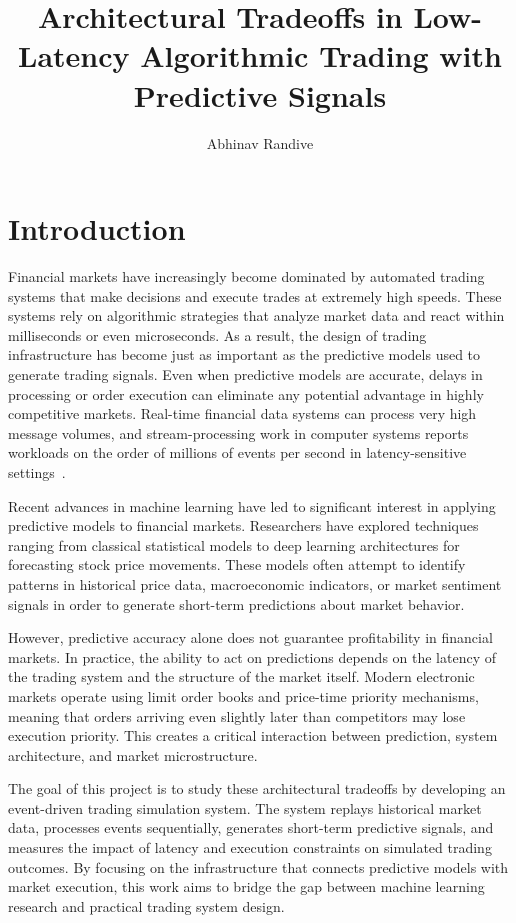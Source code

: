 \documentclass[12pt]{article}
\title{\textbf{Architectural Tradeoffs in Low-Latency
Algorithmic Trading with Predictive Signals}}
\author{Abhinav Randive}
\begin{document}
\maketitle

\section{Introduction}
Financial markets have increasingly become dominated by automated trading systems that make decisions and execute trades at extremely high speeds. 
These systems rely on algorithmic strategies that analyze market data and react within milliseconds or even microseconds. 
As a result, the design of trading infrastructure has become just as important as the predictive models used to generate trading signals. 
Even when predictive models are accurate, delays in processing or order execution can eliminate any potential advantage in highly competitive markets.
Real-time financial data systems can process very high message volumes, and stream-processing
work in computer systems reports workloads on the order of millions of events per second in
latency-sensitive settings~\cite{stonebrakerLatency}.

Recent advances in machine learning have led to significant interest in applying predictive models to financial markets. 
Researchers have explored techniques ranging from classical statistical models to deep learning architectures for forecasting stock price movements. 
These models often attempt to identify patterns in historical price data, macroeconomic indicators, or market sentiment signals in order to generate short-term predictions about market behavior.

However, predictive accuracy alone does not guarantee profitability in financial markets.
In practice, the ability to act on predictions depends on the latency of the trading system and the structure of the market itself. 
Modern electronic markets operate using limit order books and price-time priority mechanisms, meaning that orders arriving even slightly later than competitors may lose execution priority. 
This creates a critical interaction between prediction, system architecture, and market microstructure.

The goal of this project is to study these architectural tradeoffs by developing an event-driven trading simulation system. 
The system replays historical market data, processes events sequentially, generates short-term predictive signals, and measures the impact of latency and execution constraints on simulated trading outcomes. 
By focusing on the infrastructure that connects predictive models with market execution, this work aims to bridge the gap between machine learning research and practical trading system design.
\end{document}
